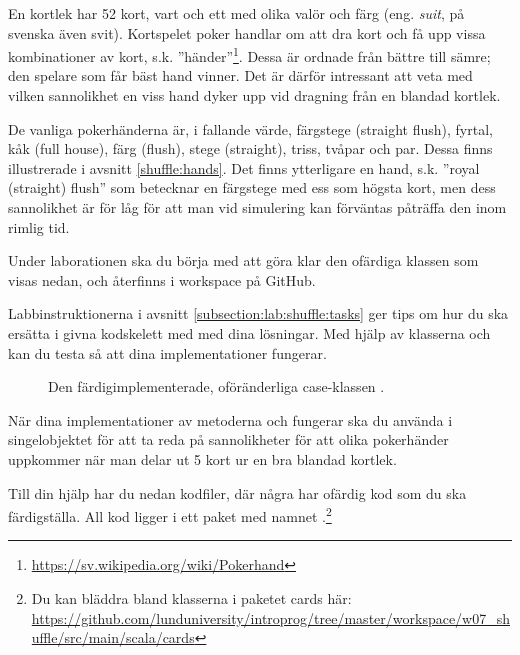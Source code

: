 En kortlek  har 52 kort, vart och ett med olika valör  och färg (eng. \emph{suit}, på svenska även svit). Kortspelet poker handlar om att dra kort och få upp vissa kombinationer av kort, s.k. ''händer''\footnote{\href{https://sv.wikipedia.org/wiki/Pokerhand}{https://sv.wikipedia.org/wiki/Pokerhand}}. Dessa är ordnade från bättre till sämre; den spelare som får bäst hand vinner.
Det är därför intressant att veta med vilken sannolikhet en viss hand dyker upp vid dragning från en blandad kortlek.

De vanliga pokerhänderna är, i fallande värde, färgstege (straight flush), fyrtal, kåk (full house), färg (flush), stege (straight), triss, tvåpar och par. Dessa finns illustrerade i avsnitt \ref{shuffle:hands}.
Det finns ytterligare en hand, s.k. ''royal (straight) flush'' som betecknar en färgstege med ess som högsta kort, men dess sannolikhet är för låg för att man vid simulering kan förväntas påträffa den inom rimlig tid.

Under laborationen ska du börja med att göra klar den ofärdiga klassen  som visas nedan, och återfinns i workspace på GitHub.



Labbinstruktionerna i avsnitt \ref{subsection:lab:shuffle:tasks} ger tips om hur du ska ersätta  i givna kodskelett med med dina lösningar.
Med hjälp av klasserna  och  kan du testa så att dina implementationer fungerar.

\begin{figure}
\caption{Den färdigimplementerade, oföränderliga case-klassen .}
\label{shuffle:fig-card}
\end{figure}




När dina implementationer av metoderna  och  fungerar ska du använda  i singelobjektet  för att ta reda på sannolikheter för att olika pokerhänder uppkommer när man delar ut 5 kort ur en bra blandad kortlek.

Till din hjälp har du nedan kodfiler, där några har ofärdig kod som du ska färdigställa. All kod  ligger i ett paket med namnet .\footnote{Du kan bläddra bland klasserna i paketet cards här: \\
\href{https://github.com/lunduniversity/introprog/tree/master/workspace/w07_shuffle/src/main/scala/cards}{\mbox{\fontsize{9}{11}\selectfont  https://github.com/lunduniversity/introprog/tree/master/workspace/w07\_shuffle/src/main/scala/cards}}}

